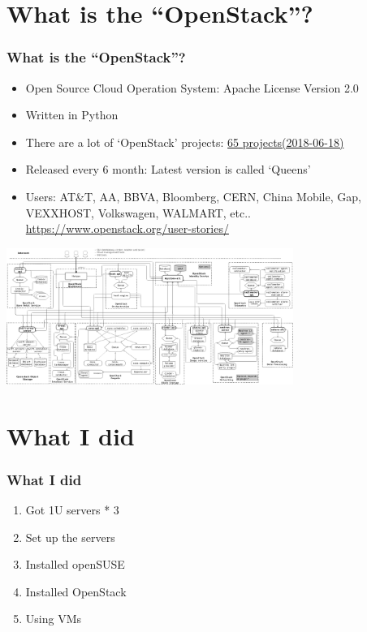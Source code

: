\documentclass[aspectratio=169,11pt,hyperref={colorlinks=true}]{beamer}
\begin{document}
\section{What is the ``OpenStack''?}
\begin{frame}
  \frametitle{What is the ``OpenStack''?}
  \begin{itemize}
    \item Open Source Cloud Operation System: Apache License Version 2.0
    \item Written in Python
    \item There are a lot of `OpenStack' projects: \href{http://governance.openstack.org/reference/projects/index.html}{65 projects(2018-06-18)}
    \item Released every 6 month: Latest version is called `Queens'
    \item Users: \scriptsize{AT\&T, AA, BBVA, Bloomberg, CERN,
      China Mobile, Gap, VEXXHOST,
      Volkswagen, WALMART, etc.. \url{https://www.openstack.org/user-stories/}}
  \end{itemize}
  \begin{center}
    \includegraphics[width=0.7\textwidth]{openstack-arch-kilo-logical-v1.png}
  \end{center}
\end{frame}

\section{What I did}
\begin{frame}
  \frametitle{What I did}
  \begin{enumerate}
    \item Got 1U servers * 3
    \item Set up the servers
    \item Installed openSUSE
    \item Installed OpenStack
    \item Using VMs
  \end{enumerate}
\end{frame}
\end{document}
